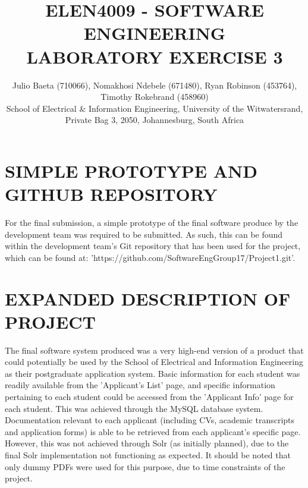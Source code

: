 \documentclass[journal,comsoc]{IEEEtran}
\begin{document}
\title{ELEN4009 - SOFTWARE ENGINEERING\\ LABORATORY EXERCISE 3}

\author{\vspace{3mm} Julio Baeta (710066), Nomakhosi Ndebele (671480), Ryan Robinson (453764), Timothy Rokebrand (458960)\\ \small \vspace{2mm} School of Electrical \& Information Engineering, University of the Witwatersrand, Private Bag 3, 2050, Johannesburg, South Africa
}

\markboth{}{}

\maketitle

\thispagestyle{empty}
\pagestyle{empty}

\IEEEpeerreviewmaketitle


\section{SIMPLE PROTOTYPE AND GITHUB REPOSITORY}

For the final submission, a simple prototype of the final software produce by the development team was required to be submitted. As such, this can be found within the development team's Git repository that has been used for the project, which can be found at: 'https://github.com/SoftwareEngGroup17/Project1.git'.


\section{EXPANDED DESCRIPTION OF PROJECT}

The final software system produced was a very high-end version of a product that could potentially be used by the School of Electrical and Information Engineering as their postgraduate application system. Basic information for each student was readily available from the 'Applicant's List' page, and specific information pertaining to each student could be accessed from the 'Applicant Info' page for each student. This was achieved through the MySQL database system. Documentation relevant to each applicant (including CVs, academic transcripts and application forms) is able to be retrieved from each applicant's specific page. However, this was not achieved through Solr (as initially planned), due to the final Solr implementation not functioning as expected. It should be noted that only dummy PDFs were used for this purpose, due to time constraints of the project.
\end{document}
